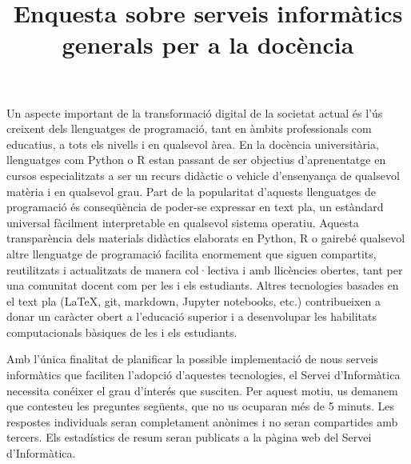 \documentclass[a4paper,12pt]{article}
\title{Enquesta sobre serveis informàtics generals per a la docència}
\begin{document}
\maketitle
Un aspecte important de la transformació digital de la societat actual és l'ús creixent
dels llenguatges de programació, tant en àmbits professionals com educatius, a tots els
nivells i en qualsevol àrea. En la docència universitària, llenguatges com Python o R
estan passant de ser objectius d'aprenentatge en cursos especialitzats a ser un recurs
didàctic o vehicle d'ensenyança de qualsevol matèria i en qualsevol grau. Part de la
popularitat d'aquests llenguatges
de programació és conseqüència de poder-se expressar en text pla, un estàndard
universal fàcilment interpretable en qualsevol sistema operatiu. Aquesta
transparència dels materials didàctics elaborats en Python, R o gairebé qualsevol altre
llenguatge de programació facilita enormement que siguen compartits, reutilitzats i
actualitzats de manera col·lectiva i amb llicències obertes, tant per una comunitat docent
com per les i els estudiants. Altres tecnologies basades en el text pla (\LaTeX, git,
markdown, Jupyter notebooks, etc.) contribueixen a donar un caràcter obert a l'educació superior
i a desenvolupar les habilitats computacionals bàsiques de les i els estudiants.

Amb l'única finalitat de planificar la possible implementació de nous serveis informàtics que
faciliten l'adopció d'aquestes tecnologies, el Servei d'Informàtica necessita conéixer el
grau d'interés que susciten. Per aquest motiu, us demanem que contesteu les preguntes següents,
que no us ocuparan més de 5 minuts. Les respostes individuals seran completament anònimes i no seran
compartides amb tercers. Els estadístics de resum seran publicats a la pàgina web del Servei
d'Informàtica. 
\end{document}
